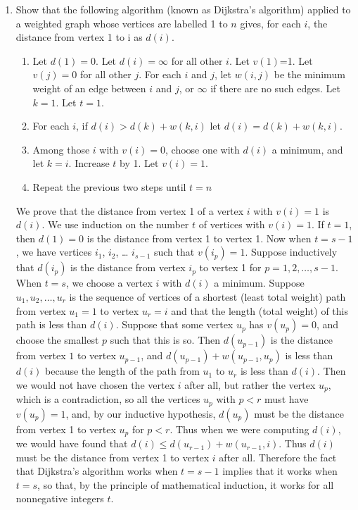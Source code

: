 \documentclass[10pt,]{book}
\theoremstyle{plain}
\theoremstyle{definition}
\numberwithin{equation}{chapter}
\newcommand{\lt}{<}
\begin{document}
\begin{enumerate}
{\setcounter{enumi}{\value{problemnumber}}} \item\hypertarget{Dijkstra}{}Show that the following algorithm (known as Dijkstra's algorithm) applied to a weighted graph whose vertices are labelled 1 to \(n\) gives, for each \(i\), the distance from vertex 1 to i as \(d(i)\).%
%
\begin{enumerate}
\item\hypertarget{li-31}{}Let \(d(1) = 0\). Let \(d(i) = \infty\) for all other \(i\).  Let \(v(1)\)=1. Let \(v(j) = 0\) for all other \(j\).  For each \(i\) and \(j\), let \(w(i,j)\) be the minimum weight of an edge between \(i\) and \(j\), or \(\infty\) if there are no such edges.  Let \(k=1\).  Let \(t=1\).%
\item\hypertarget{li-32}{}For each \(i\), if \(d(i)>d(k) + w(k,i)\) let \(d(i)= d(k) +w(k,i)\).%
\item\hypertarget{li-33}{}Among those \(i\) with \(v(i)=0\), choose one with \(d(i)\) a minimum, and let \(k=i\).  Increase \(t\) by 1. Let \(v(i) =1.\)%
\item\hypertarget{li-34}{}Repeat the previous two steps until \(t=n\)%
\end{enumerate}
We prove that the distance from vertex 1 of a vertex \(i\) with \(v(i)=1\) is \(d(i)\). We use induction on the number \(t\) of vertices with \(v(i)=1\). If \(t=1\), then \(d(1)=0\) is the distance from vertex 1 to vertex 1. Now when \(t=s-1\), we have vertices \(i_1\), \(i_2\), \dots{} \(i_{s-1}\) such that \(v(i_p)=1\). Suppose inductively that \(d(i_p)\) is the distance from vertex \(i_p\) to vertex 1 for \(p=1,2,\ldots,s-1\). When \(t=s\), we choose a vertex \(i\) with \(d(i)\) a minimum. Suppose \(u_1,u_2,\ldots, u_r\) is the sequence of vertices of a shortest (least total weight) path from vertex \(u_1=1\) to vertex \(u_r=i\) and that the length (total weight) of this path is less than \(d(i)\). Suppose that some vertex \(u_p\) has \(v(u_p)=0\), and choose the smallest \(p\) such that this is so. Then \(d(u_{p-1})\) is the distance from vertex \(1\) to vertex \(u_{p-1}\), and \(d(u_{p-1}) + w(u_{p-1},u_p)\) is less than \(d(i)\) because the length of the path from \(u_1\) to \(u_r\) is less than \(d(i)\). Then we would not have chosen the vertex \(i\) after all, but rather the vertex \(u_p\), which is a contradiction, so all the vertices \(u_p\) with \(p\lt r\) must have \(v(u_p)=1\), and, by our inductive hypothesis, \(d(u_p)\) must be the distance from vertex 1 to vertex \(u_p\) for \(p\lt r\). Thus when we were computing \(d(i)\), we would have found that \(d(i)\le d(u_{r-1}) +w(u_{r-1},i)\). Thus \(d(i)\) must be the distance from vertex 1 to vertex \(i\) after all. Therefore the fact that Dijkstra's algorithm works when \(t=s-1\) implies that it works when \(t=s\), so that, by the principle of mathematical induction, it works for all nonnegative integers \(t\).%

\end{enumerate}
\end{document}
